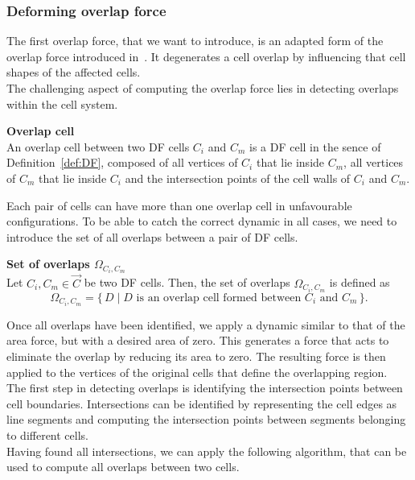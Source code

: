 \subsubsection*{Deforming overlap force}
The first overlap force, that we want to introduce, is an adapted form of the overlap force introduced in~\cite{Vogel2023}. 
It degenerates a cell overlap by influencing that cell shapes of the affected cells. \\
The challenging aspect of computing the overlap force lies in detecting overlaps within the cell system. 
\begin{definition} \textbf{Overlap cell}\\
	An overlap cell between two DF cells $C_i$ and $C_m$ is a DF cell in the sence of Definition~\ref{def:DF}, composed of all vertices of $C_i$ that lie inside $C_m$, all vertices of $C_m$ that lie inside $C_i$ and the intersection points of the cell walls of $C_i$ and $C_m$.
\end{definition}
Each pair of cells can have more than one overlap cell in unfavourable configurations.
To be able to catch the correct dynamic in all cases, we need to introduce the set of all overlaps between a pair of DF cells.
\begin{definition} \textbf{Set of overlaps $\Omega_{C_i,C_m}$}\\
	Let $C_i, C_m \in \vec{C}$ be two DF cells. 
	Then, the set of overlaps $\Omega_{C_i,C_m}$ is defined as
	\[
		\Omega_{C_i,C_m} = \{\, D \mid D \text{ is an overlap cell formed between } C_i \text{ and } C_m \,\}.
	\]
\end{definition}
Once all overlaps have been identified, we apply a dynamic similar to that of the area force, but with a desired area of zero. 
This generates a force that acts to eliminate the overlap by reducing its area to zero. 
The resulting force is then applied to the vertices of the original cells that define the overlapping region. \\
The first step in detecting overlaps is identifying the intersection points between cell boundaries.
Intersections can be identified by representing the cell edges as line segments and computing the intersection points between segments belonging to different cells. \\
Having found all intersections, we can apply the following algorithm, that can be used to compute all overlaps between two cells. 

